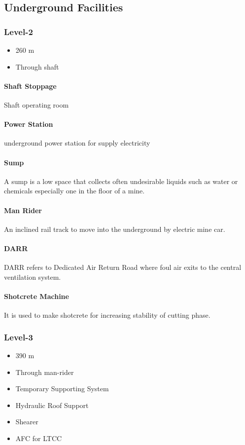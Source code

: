 \documentclass[12pt,a4paper]{article}
\begin{document}
\subsection{Underground Facilities}
\subsubsection{Level-2}
\begin{itemize}

\item 260 m
\item Through shaft

\end{itemize}
\paragraph{Shaft Stoppage}
Shaft operating room
\paragraph{Power Station}
underground power station for supply electricity
\paragraph{Sump}
A sump is a low space that collects often undesirable liquids such as water or chemicals especially one in the floor of a mine.
\paragraph{Man Rider}
An inclined rail track to move into the underground by electric mine car.
\paragraph{DARR}
DARR refers to Dedicated Air Return Road where foul air exits to the central ventilation system.
\paragraph{Shotcrete Machine}
It is used to make shotcrete for increasing stability of cutting phase.
\subsubsection{Level-3}
\begin{itemize}
\item 390 m
\item Through man-rider
\item Temporary Supporting System
\item Hydraulic Roof Support
\item Shearer
\item AFC for LTCC
\end{itemize}
\end{document}
